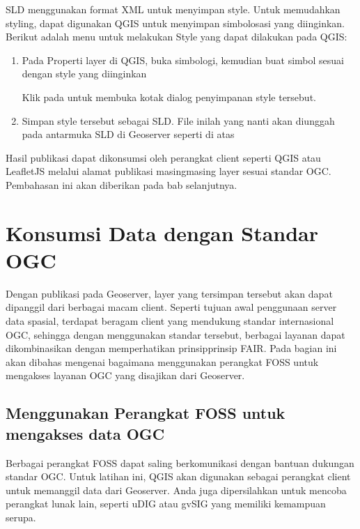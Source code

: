 \documentclass[letterpaper,10pt,english]{sphinxmanual}
\begin{document}
SLD menggunakan format XML untuk menyimpan style. Untuk memudahkan styling, dapat digunakan QGIS untuk menyimpan simbolosasi yang diinginkan. Berikut adalah menu untuk melakukan   Style yang dapat dilakukan pada QGIS:
\begin{enumerate}
%
\item {} 
Pada Properti layer di QGIS, buka simbologi, kemudian buat simbol sesuai dengan style yang diinginkan


Klik pada  untuk membuka kotak dialog penyimpanan style tersebut.

\item {} 
Simpan style tersebut sebagai SLD. File inilah yang nanti akan diunggah pada antarmuka SLD di Geoserver seperti di atas


\end{enumerate}

Hasil publikasi dapat dikonsumsi oleh perangkat client seperti QGIS atau LeafletJS melalui alamat publikasi masing\sphinxhyphen{}masing layer sesuai standar OGC. Pembahasan ini akan diberikan pada bab selanjutnya.


\section{Konsumsi Data dengan Standar OGC}
\label{\detokenize{sesi3/konsumsiogc:konsumsi-data-dengan-standar-ogc}}\label{\detokenize{sesi3/konsumsiogc::doc}}
Dengan publikasi pada Geoserver, layer yang tersimpan tersebut akan dapat dipanggil dari berbagai macam client. Seperti tujuan awal penggunaan server data spasial, terdapat beragam client yang mendukung standar internasional OGC, sehingga dengan menggunakan standar tersebut, berbagai layanan dapat dikombinasikan dengan memperhatikan prinsip\sphinxhyphen{}prinsip FAIR. Pada bagian ini akan dibahas mengenai bagaimana menggunakan perangkat FOSS untuk mengakses layanan OGC yang disajikan dari Geoserver.


\subsection{Menggunakan Perangkat FOSS untuk mengakses data OGC}
\label{\detokenize{sesi3/konsumsiogc:menggunakan-perangkat-foss-untuk-mengakses-data-ogc}}
Berbagai perangkat FOSS dapat saling berkomunikasi dengan bantuan dukungan standar OGC. Untuk latihan ini, QGIS akan digunakan sebagai perangkat client untuk memanggil data dari Geoserver. Anda juga dipersilahkan untuk mencoba perangkat lunak lain, seperti uDIG atau gvSIG yang memiliki kemampuan serupa.
\end{document}
